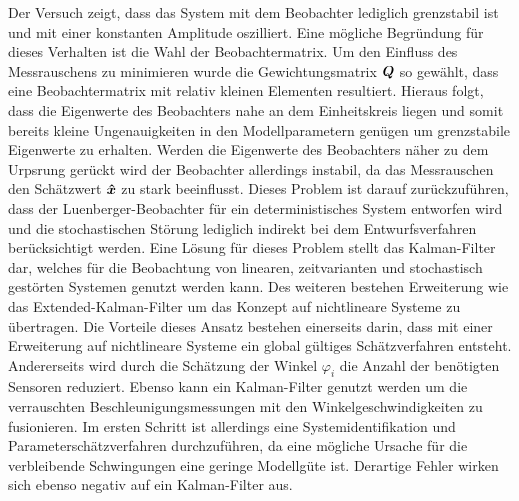 Der Versuch zeigt, dass das System mit dem Beobachter lediglich grenzstabil ist und mit einer konstanten Amplitude oszilliert. Eine mögliche Begründung für dieses Verhalten ist die Wahl der Beobachtermatrix. Um den Einfluss des Messrauschens zu minimieren wurde die Gewichtungsmatrix $\boldsymbol{Q}$ so gewählt, dass eine Beobachtermatrix mit relativ kleinen Elementen resultiert. Hieraus folgt, dass die Eigenwerte des Beobachters nahe an dem Einheitskreis liegen und somit bereits kleine Ungenauigkeiten in den Modellparametern genügen um grenzstabile Eigenwerte zu erhalten. Werden die Eigenwerte des Beobachters näher zu dem Urpsrung gerückt wird der Beobachter allerdings instabil, da das Messrauschen den Schätzwert $\boldsymbol{\hat{x}}$ zu stark beeinflusst. Dieses Problem ist darauf zurückzuführen, dass der Luenberger-Beobachter für ein deterministisches System entworfen wird und die stochastischen Störung lediglich indirekt bei dem Entwurfsverfahren berücksichtigt werden. Eine Lösung für dieses Problem stellt das Kalman-Filter dar, welches für die Beobachtung von linearen, zeitvarianten und stochastisch gestörten Systemen genutzt werden kann. Des weiteren bestehen Erweiterung wie das Extended-Kalman-Filter um das Konzept auf nichtlineare Systeme zu übertragen. 
Die Vorteile dieses Ansatz bestehen einerseits darin, dass mit einer Erweiterung auf nichtlineare Systeme ein global gültiges Schätzverfahren entsteht. Andererseits wird durch die Schätzung der Winkel $\varphi_i$ die Anzahl der benötigten Sensoren reduziert. Ebenso kann ein Kalman-Filter genutzt werden um die verrauschten Beschleunigungsmessungen mit den Winkelgeschwindigkeiten zu fusionieren. Im ersten Schritt ist allerdings eine Systemidentifikation und Parameterschätzverfahren durchzuführen, da eine mögliche Ursache für die verbleibende Schwingungen eine geringe Modellgüte ist. Derartige Fehler wirken sich ebenso negativ auf ein Kalman-Filter aus.
